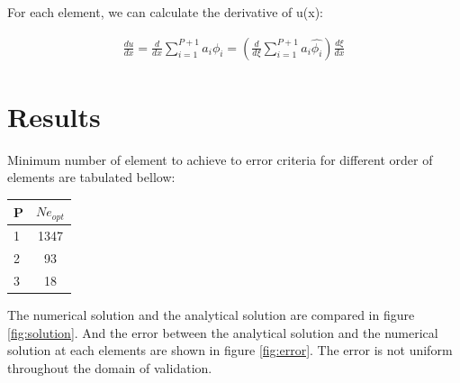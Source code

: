 \documentclass[paper=a4, fontsize=11pt]{article} %
\begin{document}
For each element, we can calculate the derivative of u(x):

\begin{eqnarray}
\frac{du}{dx} = \frac{d}{dx} \sum_{i=1}^{P+1} a_i \phi_i = (\frac{d}{d\xi}\sum_{i=1}^{P+1} a_i \hat{\phi_i})\frac{d\xi}{dx}
\end{eqnarray}

\section{Results}

Minimum number of element to achieve to error criteria for different order of elements are tabulated bellow: 

\begin{center}
  \begin{tabular}{ l | c}
    \hline
    P & $Ne_{opt}$\\ \hline
    1 & 1347\\ \hline
    2 &  93\\ \hline
    3 & 18\\ \hline
    \hline
  \end{tabular}
\end{center}
The numerical solution and the analytical solution are compared in figure \ref{fig:solution}. And the error between the analytical solution and the numerical solution at each elements are shown in figure \ref{fig:error}. The error is not uniform throughout the domain of validation. 
\end{document}
